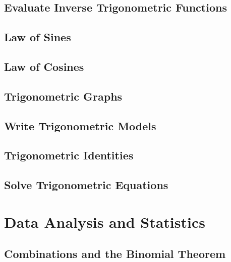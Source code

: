 \documentclass[]{book}
\begin{document}
\hypertarget{evaluate-inverse-trigonometric-functions}{%
\section{Evaluate Inverse Trigonometric Functions}\label{evaluate-inverse-trigonometric-functions}}

\hypertarget{law-of-sines}{%
\section{Law of Sines}\label{law-of-sines}}

\hypertarget{law-of-cosines}{%
\section{Law of Cosines}\label{law-of-cosines}}

\hypertarget{trigonometric-graphs}{%
\section{Trigonometric Graphs}\label{trigonometric-graphs}}

\hypertarget{write-trigonometric-models}{%
\section{Write Trigonometric Models}\label{write-trigonometric-models}}

\hypertarget{trigonometric-identities}{%
\section{Trigonometric Identities}\label{trigonometric-identities}}

\hypertarget{solve-trigonometric-equations}{%
\section{Solve Trigonometric Equations}\label{solve-trigonometric-equations}}

\hypertarget{data-analysis-and-statistics}{%
\chapter{Data Analysis and Statistics}\label{data-analysis-and-statistics}}

\hypertarget{combinations-and-the-binomial-theorem}{%
\section{Combinations and the Binomial Theorem}\label{combinations-and-the-binomial-theorem}}
\end{document}
